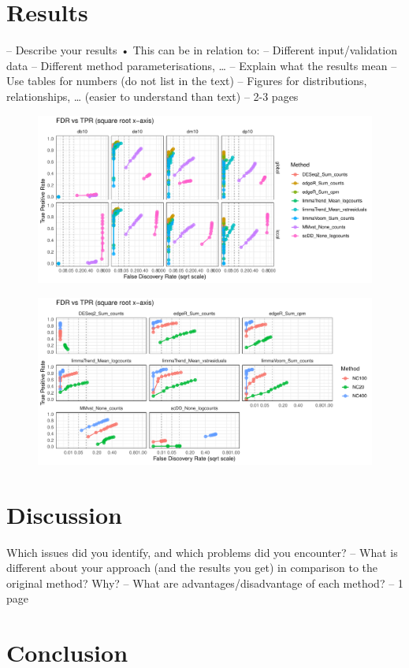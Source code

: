 \documentclass[a4paper, 11pt, twocolumn]{article}
\begin{document}
\section{Results}

– Describe your results
• This can be in relation to:
– Different input/validation data
– Different method parameterisations, …
– Explain what the results mean
– Use tables for numbers (do not list in the text)
– Figures for distributions, relationships, … (easier
to understand than text)
– 2-3 pages
\begin{figure}[!ht]
	\centering
	\includegraphics[width = \linewidth]{figs/fdrtpr_prop_method.pdf}
	\caption{
	}
	\label{fdrtpr_prop}
\end{figure}

\begin{figure}[!ht]
	\centering
	\includegraphics[width = \linewidth]{figs/fdrtpr_size_method.pdf}
	\caption{
	}
	\label{fdrtpr_size}
\end{figure}

\section{Discussion}
Which issues did you identify, and which problems
did you encounter?
– What is different about your approach (and the
results you get) in comparison to the original
method? Why?
– What are advantages/disadvantage of each
method?
– 1 page
\section{Conclusion} 


\end{document}
